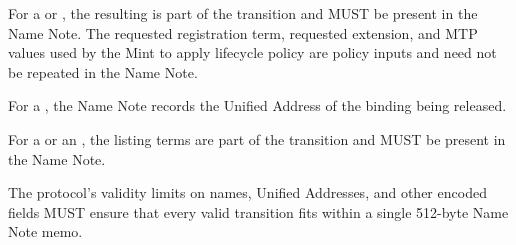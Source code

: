 For a  or , the resulting  is part of the transition and MUST be present in the Name Note. The requested registration term, requested extension, and MTP values used by the Mint to apply lifecycle policy are policy inputs and need not be repeated in the Name Note.

For a , the Name Note records the Unified Address of the binding being released.

For a  or an , the listing terms are part of the transition and MUST be present in the Name Note.

The protocol's validity limits on names, Unified Addresses, and other encoded fields MUST ensure that every valid \zns{} transition fits within a single 512-byte Name Note memo.
